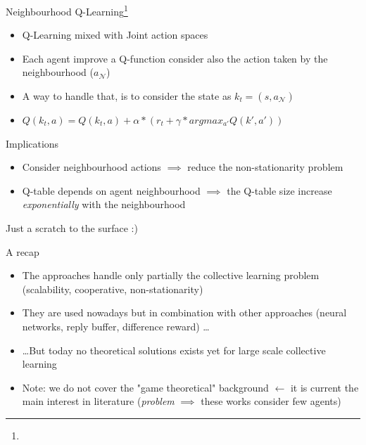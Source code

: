 \documentclass[presentation]{beamer}\mode<presentation>{\usetheme{AMSBolognaFC}}
\begin{document}
\begin{frame}{Neighbourhood Q-Learning\footnote{}}
	\begin{exampleblock}{}
		\begin{itemize}
			\item Q-Learning mixed with Joint action spaces
			\item Each agent improve a Q-function consider also the action taken by the neighbourhood ($a_{\mathcal{N}}$)
			\item A way to handle that, is to consider the state as $k_t = (s, a_{\mathcal{N}})$
			\item $Q(k_t, a) = Q(k_t, a) + \alpha * (r_t + \gamma * argmax_{a'}Q(k', a'))$
		\end{itemize}
	\end{exampleblock}

	\begin{exampleblock}{Implications}
		\begin{itemize}
			\item[{\color{teal}\faThumbsUp}] Consider neighbourhood actions $\implies$ reduce the non-stationarity problem 
			\item[{\color{red}\faThumbsDown}] Q-table depends on agent neighbourhood $\implies$ the Q-table size increase \emph{exponentially} with the neighbourhood
		\end{itemize}
	\end{exampleblock}
\end{frame}
\begin{frame}{Just a scratch to the surface :)}
	\begin{exampleblock}{A recap}
		\begin{itemize}
			\item The approaches handle only partially the collective learning problem (scalability, cooperative, non-stationarity)
			\item They are used nowadays but in combination with other approaches (neural networks, reply buffer, difference reward) \dots
			\item \dots But today no theoretical solutions exists yet for large scale collective learning
			\item Note: we do not cover the "game theoretical" background $\leftarrow$ it is current the main interest in literature (\emph{problem} $\implies$ these works consider few agents)
		\end{itemize}
	\end{exampleblock}
\end{frame}
\end{document}
